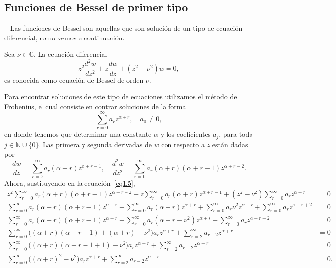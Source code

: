\documentclass[main.tex]{subfiles}
\begin{document}
\subsection{Funciones de Bessel de primer tipo}
\noindent~\cite{epelde} Las funciones de Bessel son aquellas que son solución de un tipo de ecuación diferencial, como vemos a continuación.
\begin{def.}\label{d1.3} %
  Sea $\nu\in\mathbb{C}$. La ecuación diferencial
  \begin{equation}
    \label{eq1.5}
    z^{2}\frac{d^{2}w}{dz^{2}}+z\frac{dw}{dz}+(z^{2}-\nu^{2})w=0,
  \end{equation}
  es conocida como ecuación de Bessel de orden $\nu$.
\end{def.}
Para encontrar soluciones de este tipo de ecuaciones utilizamos el método de Frobenius, el cual consiste en contrar soluciones de la forma
\[
  \sum_{r=0}^{\infty}a_{r}z^{\alpha+r},\quad a_{0}\neq0,
\]
en donde tenemos que determinar una constante $\alpha$ y los coeficientes $a_{j}$, para toda $j\in\mathbb{N}\cup\{0\}$. Las primera y segunda derivadas de $w$ con respecto a $z$ están dadas por
\[
  \frac{dw}{dz}=\sum_{r=0}^{\infty}a_{r}(\alpha+r)z^{\alpha+r-1},\quad\frac{d^{2}w}{dz^{2}}=\sum_{r=0}^{\infty}a_{r}(\alpha+r)(\alpha+r-1)z^{\alpha+r-2}.
\]
Ahora, sustituyendo en la ecuación~\eqref{eq1.5},
\begin{align*}
  z^{2}\sum_{r=0}^{\infty}a_{r}(\alpha+r)(\alpha+r-1)z^{\alpha+r-2}+z\sum_{r=0}^{\infty}a_{r}(\alpha+r)z^{\alpha+r-1}+(z^{2}-\nu^{2})\sum_{r=0}^{\infty}a_{r}z^{\alpha+r}&=0\\
  \sum_{r=0}^{\infty}a_{r}(\alpha+r)(\alpha+r-1)z^{\alpha+r}+\sum_{r=0}^{\infty}a_{r}(\alpha+r)z^{\alpha+r}+\sum_{r=0}^{\infty}a_{r}\nu^{2}z^{\alpha+r}+\sum_{r=0}^{\infty}a_{r}z^{\alpha+r+2}&=0\\
  \sum_{r=0}^{\infty}a_{r}(\alpha+r)(\alpha+r-1)z^{\alpha+r}+\sum_{r=0}^{\infty}a_{r}(\alpha+r-\nu^{2})z^{\alpha+r}+\sum_{r=0}^{\infty}a_{r}z^{\alpha+r+2}&=0\\
  \sum_{r=0}^{\infty}\big((\alpha+r)(\alpha+r-1)+(\alpha+r)-\nu^{2}\big)a_{r}z^{\alpha+r}+\sum_{r=2}^{\infty}a_{r-2}z^{\alpha+r}&=0\\
  \sum_{r=0}^{\infty}\big((\alpha+r)(\alpha+r-1+1)-\nu^{2}\big)a_{r}z^{\alpha+r}+\sum_{r=2}^{\infty}a_{r-2}z^{\alpha+r}&=0\\
  \sum_{r=0}^{\infty}\big((\alpha+r)^{2}-\nu^{2}\big)a_{r}z^{\alpha+r}+\sum_{r=2}^{\infty}a_{r-2}z^{\alpha+r}&=0.
\end{align*}
\end{document}
